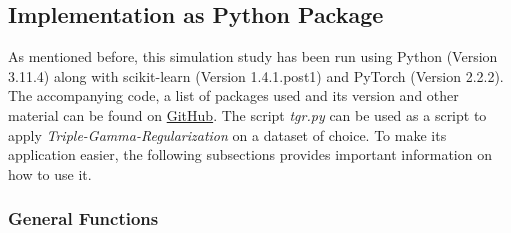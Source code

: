 \documentclass[12pt,a4paper]{article}
\begin{document}


\subsection{Implementation as Python Package}
As mentioned before, this simulation study has been run using Python (Version 3.11.4) along with scikit-learn (Version 1.4.1.post1) and PyTorch (Version 2.2.2). The accompanying code, a list of packages used and its version and other material can be found on \href{https://github.com/therealLucasPaul/MScThesis_Econ}{GitHub}. The script \textit{tgr.py} can be used as a script to apply \textit{Triple-Gamma-Regularization} on a dataset of choice. To make its application easier, the following subsections provides important information on how to use it.

\subsubsection*{General Functions}
\end{document}
